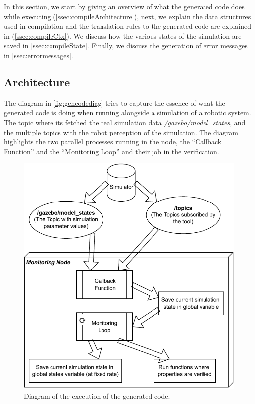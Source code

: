 In this section, we start by giving an overview of what the generated code does while executing (\autoref{ssec:compileArchitecture}), next, we explain the data structures used in compilation and the translation rules to the generated code are explained in (\autoref{ssec:compileCtx}). We discuss how the various states of the simulation are saved in \autoref{ssec:compileState}. Finally, we discuss the generation of error messages in \autoref{ssec:errormessages}. 

\subsection{Architecture}
\label{ssec:compileArchitecture}

The diagram in \autoref{fig:gencodediag} tries to capture the essence of what the generated code is doing when running alongside a simulation of a robotic system. The topic where its fetched the real simulation data \textit{/gazebo/model\_states}, and the multiple topics with the robot perception of the simulation. The diagram highlights the two parallel processes running in the node, the ``Callback Function'' and the ``Monitoring Loop'' and their job in the verification.

\begin{figure}[htb]
\includegraphics{images/gen_code_diagram.pdf}
\caption{Diagram of the execution of the generated code.} \label{fig:gencodediag}
\end{figure}

